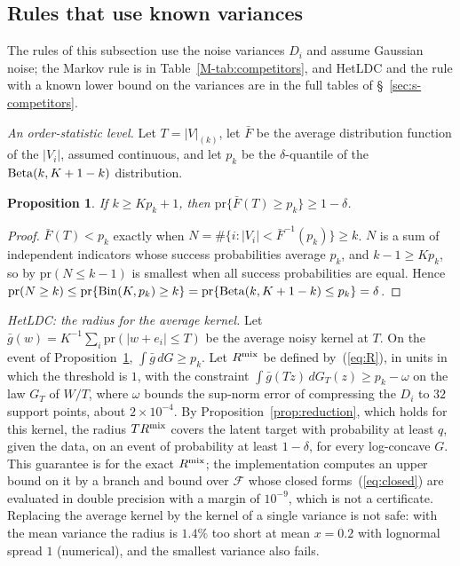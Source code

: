 \documentclass[12pt]{article}
\renewcommand{\_}{\usc\allowbreak}
\newtheorem{proposition}{Proposition}
\theoremstyle{definition}
\numberwithin{equation}{section}
\newcommand{\pr}{\mathrm{pr}}
\newcommand{\Bin}{\mathrm{Bin}}
\begin{document}
\subsection{Rules that use known variances}\label{sec:s-kv}

The rules of this subsection use the noise variances $D_i$ and assume Gaussian noise; the Markov rule is in Table~\ref{M-tab:competitors}, and HetLDC and the rule with a known lower bound on the variances are in the full tables of \S~\ref{sec:s-competitors}.

\emph{An order-statistic level.} Let $T = |V|_{(k)}$, let $\bar F$ be the average distribution function of the $|V_i|$, assumed continuous, and let $p_k$ be the $\delta$-quantile of the ${\rm Beta}(k, K + 1 - k)$ distribution.

\begin{proposition}\label{prop:beta}
If $k \ge Kp_k + 1$, then $\pr\{\bar F(T) \ge p_k\} \ge 1 - \delta$.
\end{proposition}

\begin{proof}
$\bar F(T) < p_k$ exactly when $N = \#\{i : |V_i| < \bar F^{-1}(p_k)\} \ge k$. $N$ is a sum of independent indicators whose success probabilities average $p_k$, and $k - 1 \ge Kp_k$, so by \citet{hoeffding1956} $\pr(N \le k - 1)$ is smallest when all success probabilities are equal. Hence $\pr(N \ge k) \le \pr\{\Bin(K, p_k) \ge k\} = \pr\{{\rm Beta}(k, K + 1 - k) \le p_k\} = \delta$.
\end{proof}

\emph{HetLDC: the radius for the average kernel.} Let $\bar g(w) = K^{-1}\sum_i\pr(|w + e_i| \le T)$ be the average noisy kernel at $T$. On the event of Proposition~\ref{prop:beta}, $\int\bar g\,dG \ge p_k$. Let $R^{\rm mix}$ be defined by~(\ref{eq:R}), in units in which the threshold is $1$, with the constraint $\int\bar g(Tz)\,dG_T(z) \ge p_k - \omega$ on the law $G_T$ of $W/T$, where $\omega$ bounds the sup-norm error of compressing the $D_i$ to $32$ support points, about $2 \times 10^{-4}$. By Proposition~\ref{prop:reduction}, which holds for this kernel, the radius $TR^{\rm mix}$ covers the latent target with probability at least $q$, given the data, on an event of probability at least $1 - \delta$, for every log-concave $G$. This guarantee is for the exact $R^{\rm mix}$; the implementation computes an upper bound on it by a branch and bound over $\mathcal F$ whose closed forms~(\ref{eq:closed}) are evaluated in double precision with a margin of $10^{-9}$, which is not a certificate. Replacing the average kernel by the kernel of a single variance is not safe: with the mean variance the radius is $1.4\%$ too short at mean $x = 0.2$ with lognormal spread $1$ (numerical), and the smallest variance also fails.
\end{document}
